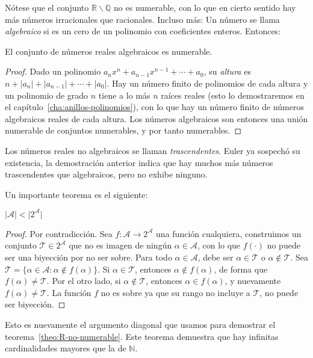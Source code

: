   Nótese que el conjunto \(\mathbb{R} \smallsetminus \mathbb{Q}\)
  no es numerable,
  con lo que en cierto sentido
  hay más números irracionales que racionales.%
  Incluso más:
  Un número se llama \emph{algebraico}%
  si es un cero de un polinomio con coeficientes enteros.%
  Entonces:
  \begin{theorem}[Cantor]
    \label{theo:algebraicos-numerable}
    El conjunto de números reales algebraicos es numerable.
  \end{theorem}
  \begin{proof}
   Dado un polinomio
   \(a_n x^n + a_{n - 1} x^{n - 1} + \dotsb + a_0\),
   su \emph{altura} es
     \(n + \lvert a_n \rvert
	 + \lvert a_{n - 1} \rvert
	 + \dotsb
	 + \lvert a_0 \rvert
     \).
   Hay un número finito de polinomios de cada altura
   y un polinomio de grado \(n\)
   tiene a lo más \(n\) raíces reales
   (esto lo demostraremos
    en el capítulo~\ref{cha:anillos-polinomios}),
   con lo que hay un número finito de números algebraicos reales
   de cada altura.
   Los números algebraicos son entonces una unión numerable
   de conjuntos numerables,
   y por tanto numerables.
  \end{proof}
  Los números reales no algebraicos se llaman \emph{trascendentes}.%
  Euler ya sospechó su existencia,%
  la demostración anterior indica
  que hay muchos más números trascendentes que algebraicos,
  pero no exhibe ninguno.

  Un importante teorema es el siguiente:
  \begin{theorem}[Cantor]
    \label{theo:A<powerset(A)}
    \(\lvert \mathcal{A} \rvert < \lvert 2^{\mathcal{A}} \rvert\)
  \end{theorem}
  \begin{proof}
    Por contradicción.
    Sea \(f \colon \mathcal{A} \rightarrow 2^{\mathcal{A}}\)
    una función cualquiera,
    construimos un conjunto \(\mathcal{T} \in 2^{\mathcal{A}}\)
    que no es imagen de ningún \(\alpha \in \mathcal{A}\),
    con lo que \(f(\cdot)\) no puede ser una biyección
    por no ser sobre.
    Para todo \(\alpha \in \mathcal{A}\),
    debe ser \(\alpha \in \mathcal{T}\)
    o \(\alpha \notin \mathcal{T}\).
    Sea \(\mathcal{T}
	    = \{\alpha \in \mathcal{A} \colon
		  \alpha \notin f(\alpha)\}\).
    Si \(\alpha \in \mathcal{T}\),
    entonces \(\alpha \notin f(\alpha)\),
    de forma que \(f(\alpha) \ne \mathcal{T}\).
    Por el otro lado,
    si \(\alpha \notin \mathcal{T}\),
    entonces \(\alpha \in f(\alpha)\),
    y nuevamente \(f(\alpha) \ne \mathcal{T}\).
    La función \(f\) no es sobre
    ya que su rango no incluye a \(\mathcal{T}\),
    no puede ser biyección.
  \end{proof}
  Esto es nuevamente el argumento diagonal%
  que usamos para demostrar el teorema~\ref{theo:R-no-numerable}.
  Este teorema demuestra que hay infinitas cardinalidades
  mayores que la de \(\mathbb{N}\).

